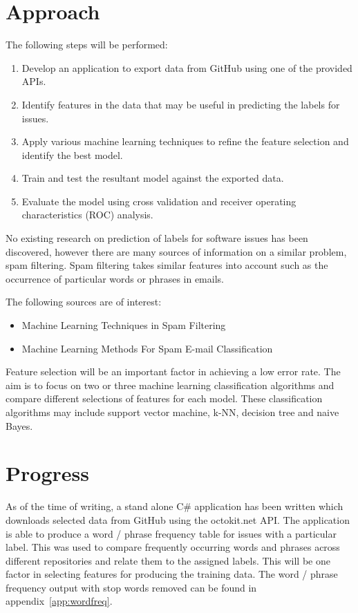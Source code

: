 \documentclass{article}
\begin{document}
\begin{multicols}{2}
\section*{Approach}
The following steps will be performed:
\begin{enumerate}
\item Develop an application to export data from GitHub using one of the provided APIs.
\item Identify features in the data that may be useful in predicting the labels for issues.
\item Apply various machine learning techniques to refine the feature selection and identify the best model.
\item Train and test the resultant model against the exported data.
\item Evaluate the model using cross validation and receiver operating characteristics (ROC) analysis.
\end{enumerate}

No existing research on prediction of labels for software issues has been discovered, however there are many sources of information on a similar problem, spam filtering. Spam filtering takes similar features into account such as the occurrence of particular words or phrases in emails.

The following sources are of interest:
\begin{itemize}
\item Machine Learning Techniques in Spam Filtering 
\item Machine Learning Methods For Spam E-mail Classification 
\end{itemize}

Feature selection will be an important factor in achieving a low error rate. The aim is to focus on two or three machine learning classification algorithms and compare different selections of features for each model. These classification algorithms may include support vector machine, k-NN, decision tree and naive Bayes.

\section*{Progress}
As of the time of writing, a stand alone C\# application has been written which downloads selected data from GitHub using the octokit.net API. The application is able to produce a word / phrase frequency table for issues with a particular label. This was used to compare frequently occurring words and phrases across different repositories and relate them to the assigned labels. This will be one factor in selecting features for producing the training data. The word / phrase frequency output with stop words removed can be found in appendix~\ref{app:wordfreq}.

\printbibliography

\end{multicols}
\end{document}
